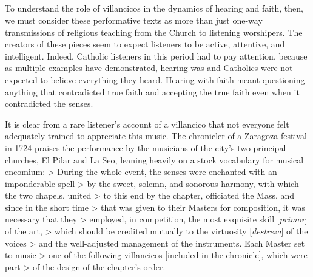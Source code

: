 \subsection{}

To understand the role of villancicos in the dynamics of hearing and faith, then, we must consider these performative texts as more than just one-way transmissions of religious teaching from the Church to listening worshipers.
The creators of these pieces seem to expect listeners to be active, attentive, and intelligent.
Indeed, Catholic listeners in this period had to pay attention, because as multiple examples have demonstrated, hearing was  and Catholics were not expected to believe everything they heard.
Hearing with faith meant questioning anything that contradicted true faith and accepting the true faith even when it contradicted the senses.

It is clear from a rare listener's account of a villancico that not everyone felt adequately trained to appreciate this music.
The chronicler of a Zaragoza festival in 1724 praises the performance by the musicians of the city's two principal churches, El Pilar and La Seo, leaning heavily on a stock vocabulary for musical encomium: 
> During the whole event, the senses were enchanted with an imponderable spell > by the sweet, solemn, and sonorous harmony, with which the two chapels, united > to this end by the chapter, officiated the Mass, and since in the short time > that was given to their Masters for composition, it was necessary that they > employed, in competition, the most exquisite skill [\emph{primor}] of the art, > which should be credited mutually to the virtuosity [\emph{destreza}] of the voices > and the well-adjusted management of the instruments.  Each Master set to music > one of the following villancicos [included in the chronicle], which were part > of the design of the chapter's order.

